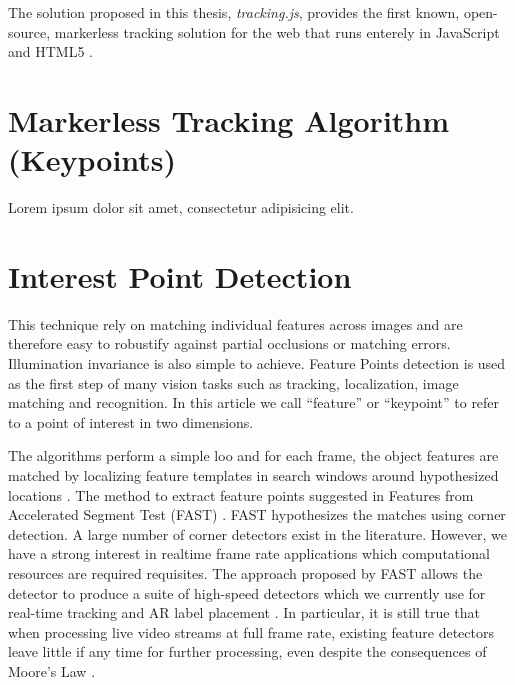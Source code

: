 The solution proposed in this thesis, \textit{tracking.js}, provides the first known, open-source, markerless tracking solution for the web that runs enterely in JavaScript \cite{International2009} and HTML5 \cite{Hickson2013}.


\section{Markerless Tracking Algorithm (Keypoints)} %
\label{sec:ar_library_for_the_web:marker_less_tracking_algorithm}

Lorem ipsum dolor sit amet, consectetur adipisicing elit.


\section{Interest Point Detection} %
\label{sec:ar_library_for_the_web:interest_point_detection}

This technique rely on matching individual features across images and are therefore easy to robustify against partial occlusions or matching errors. Illumination invariance is also simple to achieve. Feature Points detection is used as the first step of many vision tasks such as tracking, localization, image matching and recognition. In this article we call ``feature'' or ``keypoint'' to refer to a point of interest in two dimensions.

The algorithms perform a simple loo and for each frame, the object features are matched by localizing feature templates in search windows around hypothesized locations \cite{Lepetit2005}. The method to extract feature points suggested in Features from Accelerated Segment Test (FAST) \cite{Rosten2010}. FAST hypothesizes the matches using corner detection. A large number of corner detectors exist in the literature. However, we have a strong interest in realtime frame rate applications which computational resources are required requisites. The approach proposed by FAST allows the detector to produce a suite of high-speed detectors which we currently use for real-time tracking and AR label placement \cite{Calonder2010}. In particular, it is still true that when processing live video streams at full frame rate, existing feature detectors leave little if any time for further processing, even despite the consequences of Moore’s Law \cite{Rosten2010}.

